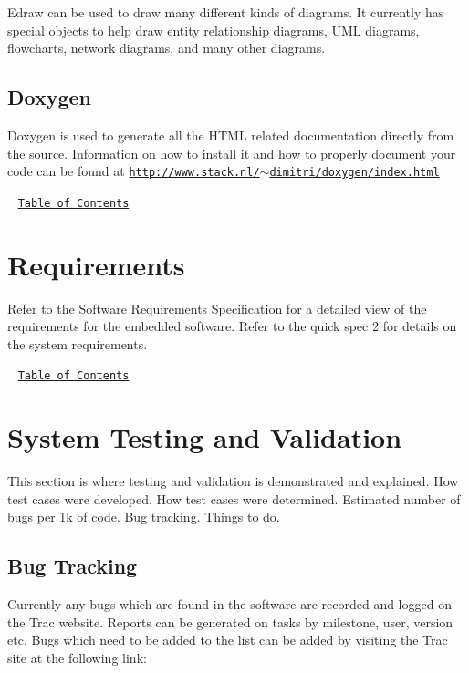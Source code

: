 Edraw can be used to draw many different kinds of diagrams. It currently has special objects to help draw entity relationship diagrams, U\+M\+L diagrams, flowcharts, network diagrams, and many other diagrams.\hypertarget{index_Doxygen}{}\subsection{Doxygen}\label{index_Doxygen}
Doxygen is used to generate all the H\+T\+M\+L related documentation directly from the source. Information on how to install it and how to properly document your code can be found at \href{http://www.stack.nl/~dimitri/doxygen/index.html}{\tt http\+://www.\+stack.\+nl/$\sim$dimitri/doxygen/index.\+html}

~\newline
\href{#Contents}{\tt Table of Contents}~\newline
 



\label{_Requirements}%
\hypertarget{index_Requirements}{}\section{Requirements}\label{index_Requirements}
Refer to the Software Requirements Specification for a detailed view of the requirements for the embedded software. Refer to the quick spec 2 for details on the system requirements.

~\newline
\href{#Contents}{\tt Table of Contents}~\newline
 



\label{_Testing}%
\hypertarget{index_Validation}{}\section{System Testing and Validation}\label{index_Validation}
This section is where testing and validation is demonstrated and explained. How test cases were developed. How test cases were determined. Estimated number of bugs per 1k of code. Bug tracking. Things to do.\hypertarget{index_Bugs}{}\subsection{Bug Tracking}\label{index_Bugs}
Currently any bugs which are found in the software are recorded and logged on the Trac website. Reports can be generated on tasks by milestone, user, version etc. Bugs which need to be added to the list can be added by visiting the Trac site at the following link\+: ~\newline
~\newline



